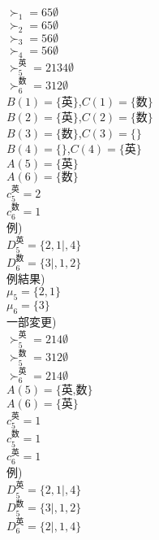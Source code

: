 \documentclass[a4j,10pt]{jsarticle}
\theoremstyle{definition}
\theoremstyle{remark}
\theoremstyle{plain}
\begin{document}
\begin{tcolorbox}[enhanced,breakable=true]
$\succ_1 = 65\emptyset$\\
$\succ_2 = 65\emptyset$\\
$\succ_3 = 56\emptyset$\\
$\succ_4 = 56\emptyset$\\


$\succ_5^{英} = 2134\emptyset$\\
$\succ_6^{数} = 312\emptyset$\\



$B(1) = \{\text{英}\}$,$C(1) = \{\text{数}\}$\\
$B(2) = \{\text{英}\}$,$C(2) = \{\text{数}\}$\\
$B(3) = \{\text{数}\}$,$C(3) = \{\}$\\
$B(4) = \{\}$,$C(4) = \{\text{英}\}$\\


$A(5) = \{\text{英}\}$\\
$A(6) = \{\text{数}\}$\\

$c_5^{\text{英}} = 2$\\
$c_6^{\text{数}} = 1$\\

例)\\
$D_5^{\text{英}} = \{2,1|,4\}$\\
$D_6^{\text{数}} = \{3|,1,2\}$\\

例結果)\\
$\mu_5 = \{2,1\}$\\
$\mu_6 = \{3\}$\\


一部変更)\\

$\succ_5^{英} = 214\emptyset$\\
$\succ_5^{数} = 312\emptyset$\\
$\succ_6^{英} = 214\emptyset$\\

$A(5) = \{\text{英,数}\}$\\
$A(6) = \{\text{英}\}$\\

$c_5^{\text{英}} = 1$\\
$c_5^{\text{数}} = 1$\\
$c_6^{\text{英}} = 1$\\

例)\\
$D_5^{\text{英}} = \{2,1|,4\}$\\
$D_5^{\text{数}} = \{3|,1,2\}$\\
$D_6^{\text{英}} = \{2|,1,4\}$\\


\end{tcolorbox}
\end{document}

